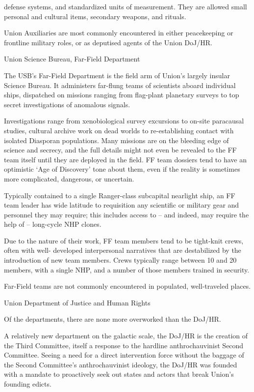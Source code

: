                                                                                                                     


defense systems, and standardized units of measurement. They are allowed small personal and  
cultural items, secondary weapons, and rituals. 
 

Union Auxiliaries are most commonly encountered in either peacekeeping or frontline military  
roles, or as deputised agents of the Union DoJ/HR.
 

Union Science Bureau, Far-Field Department  

The USB’s Far-Field Department is the field arm of Union’s largely insular Science Bureau. It  
administers far-flung teams of scientists aboard individual ships, dispatched on missions ranging  
from flag-plant planetary surveys to top secret investigations of anomalous signals. 
 

Investigations range from xenobiological survey excursions to on-site paracausal studies,  
cultural archive work on dead worlds to re-establishing contact with isolated Diasporan  
populations. Many missions are on the bleeding edge of science and secrecy, and the full details  
might not even be revealed to the FF team itself until they are deployed in the field. FF team  
dossiers tend to have an optimistic ‘Age of Discovery’ tone about them, even if the reality is  
sometimes more complicated, dangerous, or uncertain.
 

Typically contained to a single Ranger-class subcapital nearlight ship, an FF team leader has  
wide latitude to requisition any scientific or military gear and personnel they may require; this  
includes access to -- and indeed, may require the help of -- long-cycle NHP clones. 
 

Due to the nature of their work, FF team members tend to be tight-knit crews, often with well- 
developed interpersonal narratives that are destabilized by the introduction of new team  
members. Crews typically range between 10 and 20 members, with a single NHP, and a number  
of those members trained in security. 
 

Far-Field teams are not commonly encountered in populated, well-traveled places. 
 

Union Department of Justice and Human Rights  

Of the departments, there are none more overworked than the DoJ/HR.   

A relatively new department on the galactic scale, the DoJ/HR is the creation of the Third  
Committee, itself a response to the hardline anthrochauvinist Second Committee. Seeing a need  
for a direct intervention force without the baggage of the Second Committee’s anthrochauvinist  
ideology, the DoJ/HR was founded with a mandate to proactively seek out states and actors that  
break Union’s founding edicts.   


